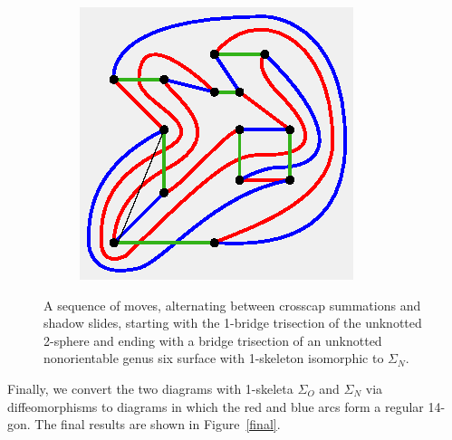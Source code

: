 \documentclass[11pt, oneside]{amsart}
\theoremstyle{theorem}
\theoremstyle{definition}
\theoremstyle{theorem}
\begin{document}
\begin{figure}[h!]
\begin{subfigure}{.25\textwidth}
  \centering
  \includegraphics[width=.9\linewidth]{nonbt13.eps}
  \label{nxb13}
\end{subfigure}
\caption{A sequence of moves, alternating between crosscap summations and shadow slides, starting with the 1-bridge trisection of the unknotted 2-sphere and ending with a bridge trisection of an unknotted nonorientable genus six surface with 1-skeleton isomorphic to $\Sigma_N$.}
\label{nxb}
\end{figure}

Finally, we convert the two diagrams with 1-skeleta $\Sigma_O$ and $\Sigma_N$ via diffeomorphisms to diagrams in which the red and blue arcs form a regular 14-gon.  The final results are shown in Figure~\ref{final}.
\end{document}
